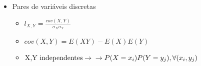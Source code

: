 \documentclass{article}
\begin{document}
\begin{multicols*}{2}
\begin{itemize}
    \item{Pares de variáveis discretas}
    \begin{itemize}
        \item $l_{X,Y}=\frac{cov(X,Y)}{\sigma_X \sigma_Y}$
        \item $cov(X,Y)=E(XY)-E(X)E(Y)$
        \item $\text{X,Y independentes} \rightarrow \newline \rightarrow P(X=x_i)P(Y=y_j), \forall(x_i, y_j)$
    \end{itemize}    

\end{itemize}
\end{multicols*}
\end{document}
